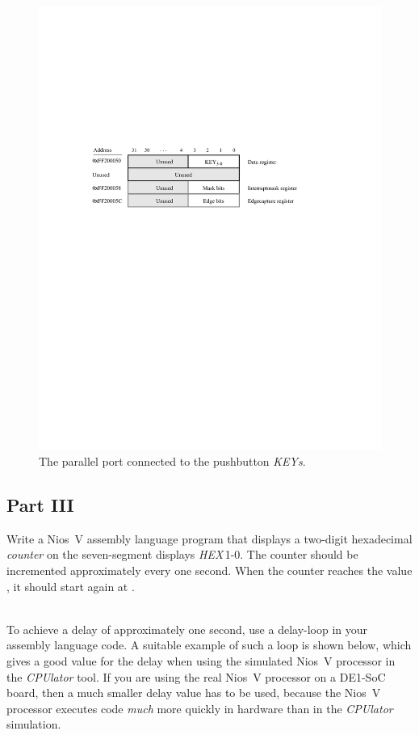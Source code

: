 \documentclass[epsfig,10pt,fullpage]{article}
\begin{document}
~\\
\begin{figure}[h]
	\begin{center}
	\includegraphics[scale=1]{figures/figureKEY.pdf}
	\end{center}
	\caption{The parallel port connected to the pushbutton {\it KEYs}.}
\label{fig:KEY}
\end{figure}

\subsection*{Part III}

\noindent
Write a Nios~V assembly language program that displays a two-digit hexadecimal \emph{counter} 
on the seven-segment displays {\it HEX}$\,$1-0. The counter should be incremented approximately
every one second. When the counter reaches the value , it should start again at
.

~\\
\noindent
To achieve a delay of approximately one second, use a delay-loop in your assembly language
code. A suitable example of such a loop is shown below, which gives a good value for the delay 
when using the simulated Nios~V processor in the {\it CPUlator} tool. If you are using the
real Nios~V processor on a DE1-SoC board, then a much smaller delay value has to be used, 
because the Nios~V processor executes code {\it much} more quickly in hardware than in the
{\it CPUlator} simulation. 
\end{document}

